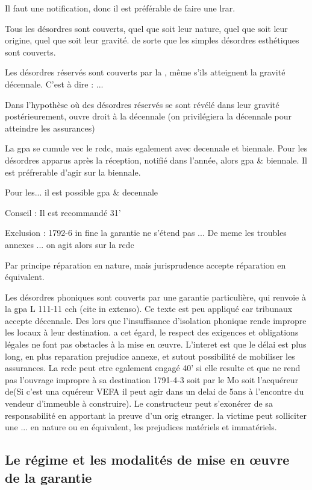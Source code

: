 			Il faut une notification, donc il est préférable de faire une lrar.

			Tous les désordres sont couverts, quel que soit leur nature, quel que soit leur origine, quel que soit leur gravité. de sorte que les simples désordres esthétiques sont couverts.

			Les désordres réservés sont couverts par la \gpa, même s'ils atteignent la gravité décennale. C'est à dire : ...

			Dans l'hypothèse où des désordres réservés se sont révélé dans leur gravité postérieurement,  ouvre droit à la décennale (on privilégiera la décennale pour atteindre les assurances)

			La gpa se cumule vec le rcdc, mais egalement avec decennale et biennale.
			Pour les désordres apparus après la réception, notifié dans l'année, alors gpa \& biennale. Il est préfrerable d'agir sur la biennale.

			Pour les... il est possible gpa \& decennale

			Conseil : Il est recommandé 31'

			Exclusion : 1792-6 in fine la garantie ne s'étend pas ...
			De meme les troubles annexes ... on agit alors sur la rcdc

			Par principe réparation en nature, mais jurisprudence accepte réparation en équivalent.

			Les désordres phoniques sont couverts par une garantie particulière, qui renvoie à la gpa L 111-11 cch (cite in extenso). Ce texte est peu appliqué car tribunaux accepte décennale. Des lors que l'insuffisance d'isolation phonique rende impropre les locaux à leur destination. a cet égard, le respect des exigences et obligations légales ne font pas obstacles à la mise en œuvre. L'interet est que le délai est plus long, en plus reparation prejudice annexe, et sutout possibilité de mobiliser les assurances. La rcdc peut etre egalement engagé 40' si elle resulte et que ne rend pas l'ouvrage impropre à sa destination 1791-4-3 soit par le Mo soit l'acquéreur de(Si c'est una cquéreur VEFA il peut agir dans un delai de 5ans à l'encontre du vendeur d'immeuble à construire).
			Le constructeur peut s'exonérer de sa responsabilité en apportant la preuve d'un orig etranger. la victime peut solliciter une ... en nature ou en équivalent, les prejudices matériels et immatériels.

		\subsection{Le régime et les modalités de mise en œuvre de la garantie}

